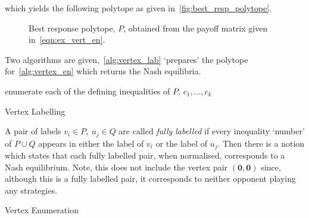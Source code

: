 which yields the following polytope as given in~\autoref{fig:best_resp_polytope}.

\begin{figure}
    \centering
    
    \caption{Best response polytope, \(P\), obtained from the payoff matrix given in~\eqref{eqn:ex_vert_en}.}\label{fig:best_resp_polytope}
\end{figure}

Two algorithms are given,~\autoref{alg:vertex_lab} `prepares' the polytope for~\autoref{alg:vertex_en} which returns the Nash equilibria.

\IncMargin{2em}
\begin{algorithm}
    \DontPrintSemicolon

    enumerate each of the defining inequalities of \(P\), \(c_{1}, \ldots,
    c_{k}\) \\
    \caption{Vertex Labelling}\label{alg:vertex_lab}
\end{algorithm}
\DecMargin{2em}

A pair of labels \(v_{i} \in P, ~ u_{j} \in Q\) are called \emph{fully labelled}
if every inequality `number' of \(P \cup Q\) appears in either the label of
\(v_{i}\) or the label of \(u_{j}\). Then there is a notion which states that
each fully labelled pair, when normalised, corresponds to a Nash equilibrium.
Note, this does not include the vertex pair \((\textbf{0}, \textbf{0})\) since,
although this is a fully labelled pair, it corresponds to neither opponent playing any strategies. 

\IncMargin{2em}
\begin{algorithm}
    \DontPrintSemicolon

    \caption{Vertex Enumeration}\label{alg:vertex_en}
\end{algorithm}
\DecMargin{2em}


